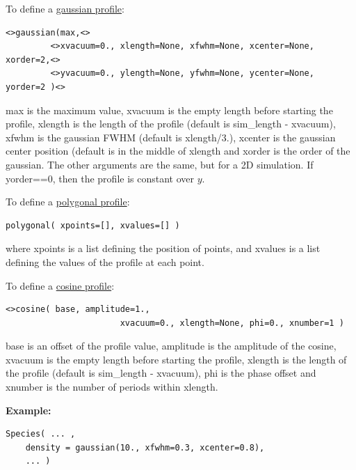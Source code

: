 \documentclass[11pt]{article}
\newcommand{\code}[1]{\colorbox{yellow!15}{\ttfamily #1}}
\begin{document}
To define a \underline{gaussian profile}:
\begin{lstlisting}
<>gaussian(max,<>
         <>xvacuum=0., xlength=None, xfwhm=None, xcenter=None, xorder=2,<>
         <>yvacuum=0., ylength=None, yfwhm=None, ycenter=None, yorder=2 )<>
\end{lstlisting}
\code{max} is the maximum value, \code{xvacuum} is the empty length before starting the profile,
\code{xlength} is the length of the profile (default is {\ttfamily sim\_length - xvacuum}),
\code{xfwhm} is the gaussian FWHM (default is {\ttfamily xlength/3.}),
\code{xcenter} is the gaussian center position (default is in the middle of {\ttfamily xlength}
and \code{xorder} is the order of the gaussian.
The other arguments are the same, but for a 2D simulation. If \code{yorder==0}, then the profile is constant over $y$.\\
\vspace{10pt}

To define a \underline{polygonal profile}:
\begin{lstlisting}
polygonal( xpoints=[], xvalues=[] )
\end{lstlisting}
where \code{xpoints} is a list defining the position of points, and \code{xvalues} is
a list defining the values of the profile at each point.\\
\vspace{10pt}

To define a \underline{cosine profile}:
\begin{lstlisting}
<>cosine( base, amplitude=1.,
                       xvacuum=0., xlength=None, phi=0., xnumber=1 )
\end{lstlisting}
\code{base} is an offset of the profile value, \code{amplitude} is the amplitude of the cosine,
\code{xvacuum} is the empty length before starting the profile,
\code{xlength} is the length of the profile (default is {\ttfamily sim\_length - xvacuum}),
\code{phi} is the phase offset
and \code{xnumber} is the number of periods within \code{xlength}.\\
\vspace{10pt}

\textbf{Example:}
\begin{lstlisting}
Species( ... ,
	density = gaussian(10., xfwhm=0.3, xcenter=0.8),
	... )
\end{lstlisting}
\vspace{10pt}
\end{document}
